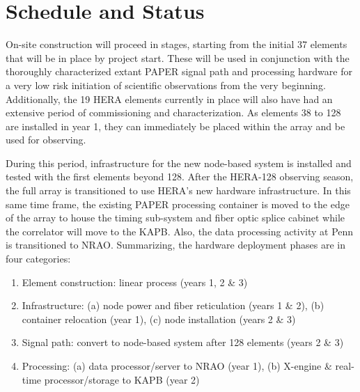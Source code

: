 \documentclass[preprint,11pt]{aastex}
\begin{document}
\section{Schedule and Status}
\label{sec:status}

\noindent On-site construction will proceed in stages, starting from the
initial 37 elements that will be in place by project start.  These will be used
in conjunction with the thoroughly characterized extant PAPER signal path and
processing hardware for a very low risk initiation of scientific observations
from the very beginning.  Additionally, the 19 HERA elements currently in
place will also have had an extensive period of commissioning
and characterization.  As elements 38 to 128 are installed in year 1, they can
immediately be placed within the array and be used for observing.

During this period, infrastructure for the new node-based system is installed
and tested with the first elements beyond 128.  After the HERA-128 observing
season, the full array is transitioned to use HERA's new hardware infrastructure.  In this same time frame, the existing PAPER processing
container is moved to the edge of the array to house the timing sub-system
and fiber optic splice cabinet while the correlator will move to the KAPB.
Also, the data processing activity at Penn is transitioned to NRAO.
Summarizing, the hardware deployment phases are in four categories:
\begin{enumerate}
\item Element construction:  linear process (years 1, 2 \& 3)
\item Infrastructure:  (a) node power and fiber reticulation (years 1 \& 2), (b) container relocation (year 1), (c) node installation (years 2 \& 3)
\item Signal path:  convert to node-based system after 128 elements (years 2 \& 3)
\item Processing:  (a) data processor/server to NRAO (year 1), (b) X-engine \& real-time processor/storage to KAPB (year 2)
\end{enumerate}
\end{document}
